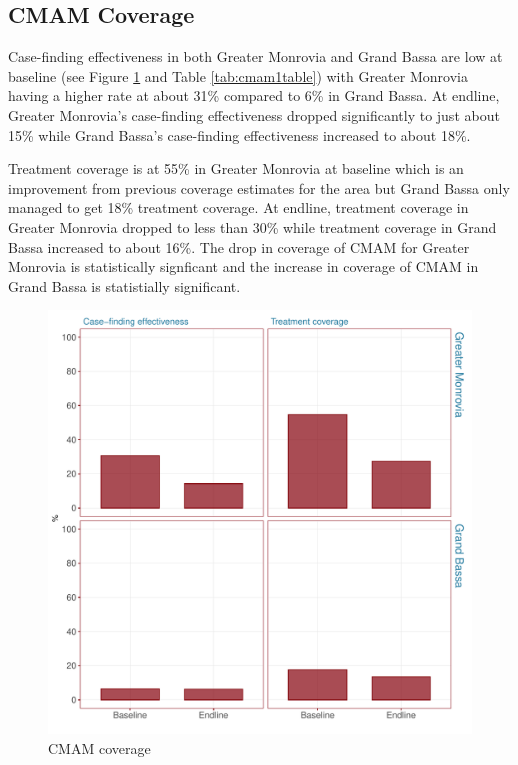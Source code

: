 \documentclass[12pt,a4paper]{article}
\begin{document}
\newpage

\hypertarget{cmam-coverage-1}{%
\subsection{CMAM Coverage}\label{cmam-coverage-1}}

Case-finding effectiveness in both Greater Monrovia and Grand Bassa are low at baseline (see Figure \ref{fig:cmam1plot} and Table \ref{tab:cmam1table}) with Greater Monrovia having a higher rate at about 31\% compared to 6\% in Grand Bassa. At endline, Greater Monrovia's case-finding effectiveness dropped significantly to just about 15\% while Grand Bassa's case-finding effectiveness increased to about 18\%.

Treatment coverage is at 55\% in Greater Monrovia at baseline which is an improvement from previous coverage estimates for the area but Grand Bassa only managed to get 18\% treatment coverage. At endline, treatment coverage in Greater Monrovia dropped to less than 30\% while treatment coverage in Grand Bassa increased to about 16\%. The drop in coverage of CMAM for Greater Monrovia is statistically signficant and the increase in coverage of CMAM in Grand Bassa is statistially significant.

\begin{figure}[H]

{\centering \includegraphics{liberiaCoverageFinalReport_files/figure-latex/cmam1plot-1} 

}

\caption{CMAM coverage}\label{fig:cmam1plot}
\end{figure}
\end{document}
